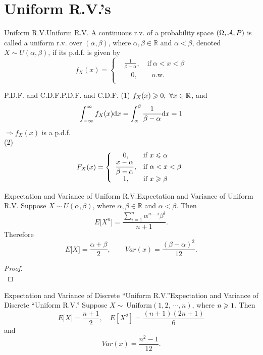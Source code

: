 \documentclass{elegantbook}
\begin{document}
\section{Uniform R.V.'s}

\begin{definition}{Uniform R.V.}{Uniform R.V.}
A continuous r.v. of a probability space $(\Omega,\mathcal{A}, P)$ is called a uniform r.v. over $(\alpha,\beta)$, where $\alpha,\beta\in\mathbb{R}$ and $\alpha<\beta$, denoted $X\sim U(\alpha,\beta)$, if its p.d.f. is given by
$$
f_{X}(x) = \left\{ \begin{aligned}
&\frac{1}{\beta - \alpha},\quad\mathrm{\text{if}}\ \alpha < x < \beta \\
&\quad0,\qquad\mathrm{\text{o.w.}}\\
\end{aligned} \right.
$$
\end{definition}

\begin{remark}{P.D.F. and C.D.F.}{P.D.F. and C.D.F.}
(1) $f_X(x)\geqslant0,\ \forall x\in\mathbb{R}$, and
$$
\int_{-\infty}^{\infty}{f_X(x)}\dif x=\int_{\alpha}^{\beta}\frac{1}{\beta-\alpha}\dif x=1
$$
$\Rightarrow f_X(x)$ is a p.d.f.\\
(2)
$$
F_{X}(x) = \left\{ \begin{array}{cl}
0,&\mathrm{\text{if}}\ x \leqslant \alpha \\
\dfrac{x - \alpha}{\beta - \alpha},&\mathrm{\text{if}}\ \alpha < x < \beta \\
1,&\mathrm{\text{if}}\ x \geqslant \beta \\
\end{array} \right.
$$
\end{remark}

\begin{theorem}{Expectation and Variance of Uniform R.V.}{Expectation and Variance of Uniform R.V.}
Suppose $X\sim U(\alpha,\beta)$, where $\alpha,\beta\in\mathbb{R}$ and $\alpha<\beta$. Then
$$
E\lbrack X^{n}\rbrack = \frac{\sum\limits_{i = 1}^{n}{\alpha^{n - i}\beta^{i}}}{n + 1}.
$$
Therefore
$$
E\lbrack X\rbrack = \frac{\alpha + \beta}{2},\qquad
Var(x)=\frac{(\beta-\alpha)^2}{12}.
$$
\end{theorem}

\begin{proof}
\\[4cm]\vspace{0.01cm}
\end{proof}

\begin{remark}{Expectation and Variance of Discrete ``Uniform R.V.''}{Expectation and Variance of Discrete ``Uniform R.V.''}
Suppose $X\sim\ \mathrm{Uniform}(1,2,\ \cdots,n)$, where $n\geqslant1$. Then
$$
E\lbrack X\rbrack = \frac{n + 1}{2},\quad E\left\lbrack X^{2}\right\rbrack = \frac{(n + 1)(2n + 1)}{6}
$$
and
$$
Var(x)=\frac{n^2-1}{12}.
$$
\end{remark}
\end{document}
